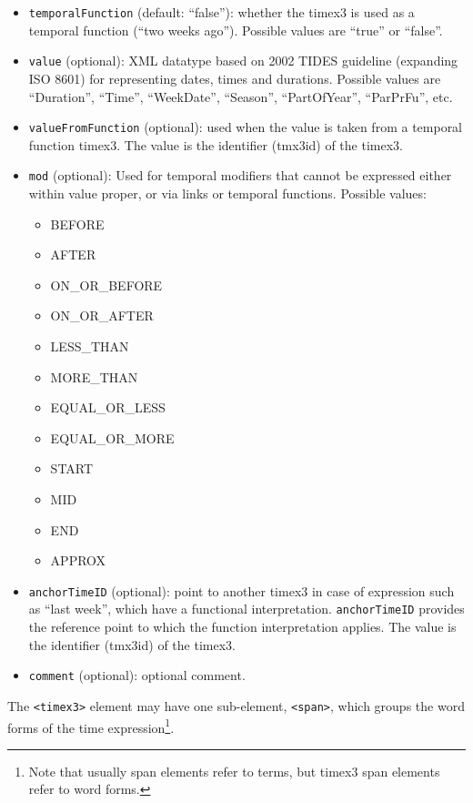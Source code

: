 \begin{itemize}
\begin{tabular}{|c|p{9cm}|}
  \end{tabular}

\item \texttt{temporalFunction} (default: ``false''): whether the timex3 is
  used as a temporal function (``two weeks ago''). Possible values are
  ``true'' or ``false''.

\item \texttt{value} (optional): XML datatype based on 2002 TIDES guideline
  (expanding ISO 8601) for representing dates, times and durations. Possible
  values are ``Duration'', ``Time'', ``WeekDate'', ``Season'',
  ``PartOfYear'', ``ParPrFu'', etc.

\item \texttt{valueFromFunction} (optional): used when the value is taken
  from a temporal function timex3. The value is the identifier (tmx3id) of
  the timex3.

\item \texttt{mod} (optional): Used for temporal modifiers that cannot be
  expressed either within value proper, or via links or temporal
  functions. Possible values:
  \begin{itemize}
  \item BEFORE
  \item AFTER
  \item ON\_OR\_BEFORE
  \item ON\_OR\_AFTER
  \item LESS\_THAN
  \item MORE\_THAN
  \item EQUAL\_OR\_LESS
  \item EQUAL\_OR\_MORE
  \item START
  \item MID
  \item END
  \item APPROX
  \end{itemize}

\item \texttt{anchorTimeID} (optional): point to another timex3 in case of
  expression such as ``last week'', which have a functional
  interpretation. \texttt{anchorTimeID} provides the reference point to
  which the function interpretation applies. The value is the identifier
  (tmx3id) of the timex3.
\item \texttt{comment} (optional): optional comment.
\end{itemize}

The \texttt{<timex3>} element may have one sub-element, \texttt{<span>},
which groups the word forms of the time expression\footnote{Note
  that usually span elements refer to terms, but timex3 span elements refer
  to word forms.}.

